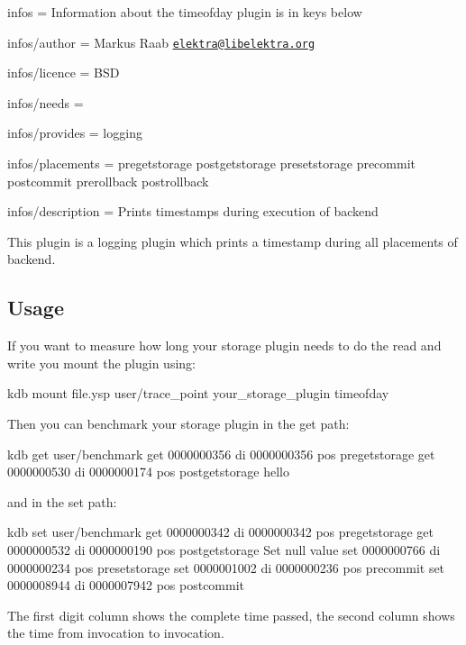 
\begin{DoxyItemize}
\item infos = Information about the timeofday plugin is in keys below
\item infos/author = Markus Raab \href{mailto:elektra@libelektra.org}{\tt elektra@libelektra.\+org}
\item infos/licence = B\+S\+D
\item infos/needs =
\item infos/provides = logging
\item infos/placements = pregetstorage postgetstorage presetstorage precommit postcommit prerollback postrollback
\item infos/description = Prints timestamps during execution of backend
\end{DoxyItemize}

This plugin is a logging plugin which prints a timestamp during all placements of backend.

\subsection*{Usage}

If you want to measure how long your storage plugin needs to do the read and write you mount the plugin using\+: \begin{DoxyVerb}kdb mount file.ysp user/trace_point your_storage_plugin timeofday
\end{DoxyVerb}


Then you can benchmark your storage plugin in the get path\+: \begin{DoxyVerb}kdb get user/benchmark
get     0000000356      di      0000000356      pos     pregetstorage
get     0000000530      di      0000000174      pos     postgetstorage
hello
\end{DoxyVerb}


and in the set path\+: \begin{DoxyVerb}kdb set user/benchmark
get     0000000342      di      0000000342      pos     pregetstorage
get     0000000532      di      0000000190      pos     postgetstorage
Set null value
set     0000000766      di      0000000234      pos     presetstorage
set     0000001002      di      0000000236      pos     precommit
set     0000008944      di      0000007942      pos     postcommit
\end{DoxyVerb}


The first digit column shows the complete time passed, the second column shows the time from invocation to invocation. 